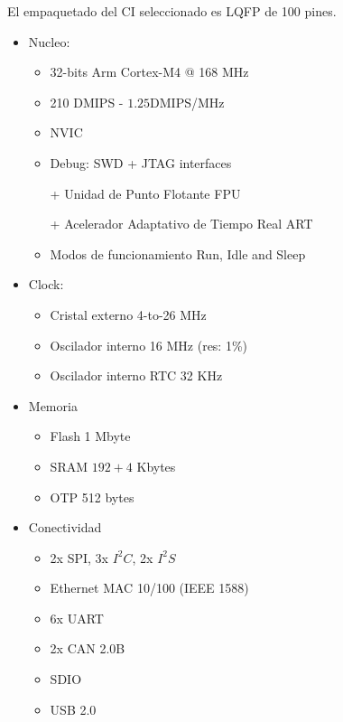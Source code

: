 \documentclass[10pt,a4paper]{article}
\begin{document}
El empaquetado del \acrshort{CI} seleccionado es \acrfull{LQFP} de 100 pines.

\begin{itemize}                                                                  
    \item Nucleo: 

        \begin{itemize}                                                                  
            \item  32-bits Arm Cortex-M4 @ 168 MHz     
            \item  210 \acrshort{DMIPS} - $1.25$\acrshort{DMIPS}/MHz
            \item \acrfull{NVIC}
            \item Debug: \acrfull{SWD} + JTAG interfaces
            \item [+] Unidad de Punto Flotante \acrshort{FPU} 
            \item [+] Acelerador Adaptativo de Tiempo Real \acrshort{ART} 
            \item Modos de funcionamiento Run, Idle and Sleep                          
        \end{itemize}

    \item Clock:

        \begin{itemize}
            \item Cristal externo 4-to-26 MHz 
            \item Oscilador interno 16 MHz (res: 1\%)
            \item Oscilador interno RTC 32 KHz 
        \end{itemize}

    \item Memoria                                       

        \begin{itemize}                                                                  
            \item Flash 1 Mbyte 
            \item \acrshort{SRAM} $192+4$ Kbytes  
            \item \acrshort{OTP} 512 bytes 
        \end{itemize}

    \item Conectividad

        \begin{itemize}                                                                  
            \item 2x SPI, 3x $I^2C$, 2x $I^2S$
            \item Ethernet MAC 10/100 (IEEE 1588)
            \item 6x UART 
            \item 2x CAN 2.0B 
            \item SDIO 
            \item USB 2.0 
        \end{itemize}


\end{itemize}
\end{document}
